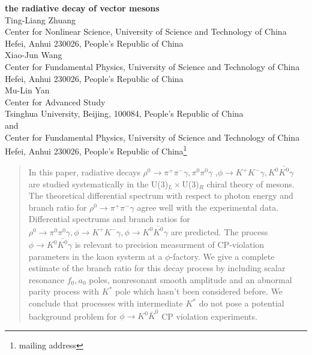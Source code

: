 \setlength{\textwidth}{6.5in}
\setlength{\oddsidemargin}{0in}
\setlength{\evensidemargin}{0in}
\newcommand{\an}[0]{\bigtriangledown}


\draft
\begin{center}
{\Large {\bf \sc the radiative decay of vector mesons}}
\\[5mm]
Ting-Liang Zhuang\\
{\small Center for Nonlinear Science, University of Science and Technology
of China}\\
{\small Hefei, Anhui 230026, People's Republic of China}\\[2mm]
Xiao-Jun Wang\\
{\small Center for Fundamental Physics, University of Science and
Technology  
of China}\\
{\small Hefei, Anhui 230026, People's Republic of China}\\[2mm]
Mu-Lin Yan\\
{\small Center for Advanced Study \\
Tsinghua University, Beijing, 100084, People's Republic of China}\\
{\small and}\\
{\small  Center for Fundamental Physics,
University of Science and Technology of China\\
Hefei, Anhui 230026, People's Republic of China}\footnote{mailing
address}\\
\end{center}
\vspace{8mm}
\begin{abstract}
\noindent
In this paper, radiative decays $\rho^0 \rightarrow \pi^+\pi^-\gamma ,
\pi^0\pi^0\gamma$ ,$\phi \rightarrow K^+K^-\gamma ,K^0 \bar{K^0}\gamma$
are studied systematically in the U(3)$_L\times$U(3)$_R$ chiral 
theory of mesons. The theoretical differential spectrum with respect 
to photon energy and branch ratio for $\rho^0 \rightarrow
\pi^+\pi^-\gamma$ agree well with the experimental data. Differential
spectrums and branch ratios for $\rho^0 \rightarrow \pi^0\pi^0\gamma,
\phi \rightarrow K^+ K^-\gamma,\phi \rightarrow K^0\bar{K^0}\gamma$ are
predicted. The process $\phi \to K^0 \bar{K^0} \gamma$ is relevant to
precision measurment of CP-violation parameters in the kaon systerm at a
$\phi$-factory. We give a complete estimate of the branch ratio for
this decay process by including scalar resonance $f_0, a_0$ poles,
nonresonant smooth amplitude and an abnormal parity process with
$K^*$ pole which hasn't been considered before. We conclude that processes
with intermediate $K^*$ do not pose a potential background problem for 
$\phi\rightarrow K^0\bar{K}^0$ CP violation experiments.
\end{abstract}

